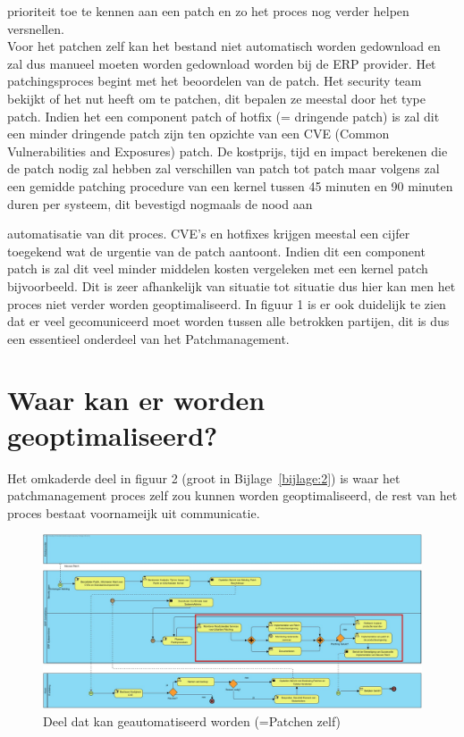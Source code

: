 prioriteit toe te kennen aan een patch en zo het proces nog verder helpen versnellen. \\





Voor het patchen zelf kan het bestand niet automatisch worden gedownload en zal dus manueel moeten worden gedownload worden bij de ERP provider. Het patchingsproces begint met het beoordelen van de patch. Het security team bekijkt of het nut heeft
om te patchen, dit bepalen ze meestal door het type patch. Indien het een component patch of hotfix (= dringende patch) is zal dit een minder dringende patch zijn ten opzichte van een CVE (Common Vulnerabilities and Exposures) patch. De kostprijs, tijd en impact berekenen
die de patch nodig zal hebben zal verschillen van patch tot patch maar volgens \textcite{Heyndrickx2024} zal een gemidde patching procedure van een kernel tussen 45 minuten en 90 minuten duren per systeem, dit bevestigd nogmaals de nood aan

automatisatie van dit proces. CVE's en hotfixes krijgen meestal een cijfer toegekend wat de urgentie van de patch aantoont. Indien dit een component patch is zal dit veel minder middelen kosten vergeleken
met een kernel patch bijvoorbeeld. Dit is zeer afhankelijk van situatie tot situatie dus hier kan men het proces niet verder worden geoptimaliseerd. In figuur 1 is er ook duidelijk te zien dat er veel gecomuniceerd moet worden tussen alle betrokken partijen, dit is dus een essentieel onderdeel van het Patchmanagement. \\


\section{Waar kan er worden geoptimaliseerd?}

Het omkaderde deel in figuur 2 (groot in Bijlage~\ref{bijlage:2}) is waar het patchmanagement proces zelf zou kunnen worden geoptimaliseerd, de rest van het proces bestaat voornameijk uit communicatie.
 \begin{figure}[h]
    \centering
    \includegraphics[width=\textwidth]{huidigesituatie2.jpg}
    \caption{Deel dat kan geautomatiseerd worden (=Patchen zelf)}
     \label{fig:huidigesituatie2}
\end{figure}
\newpage


